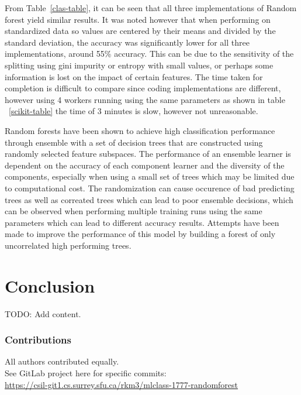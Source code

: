 \documentclass{article} %
\begin{document}
From Table~\ref{clas-table}, it can be seen that all three implementations of Random forest yield similar results. It was noted however that when performing on standardized data so values are centered by their means and divided by the standard deviation, the accuracy was significantly lower for all three implementations, around 55\% accuracy. This can be due to the sensitivity of the splitting using gini impurity or entropy with small values, or perhaps some information is lost on the impact of certain features. The time taken for completion is difficult to compare since coding implementations are different, however using 4 workers running using the same parameters as shown in table ~\ref{scikit-table} the time of 3 minutes is slow, however not unreasonable. 

Random forests have been shown to achieve high classification performance through ensemble with a set of decision trees that are constructed using randomly selected feature subspaces. The performance of an ensemble learner is dependent on the accuracy of each component learner and the diversity of the components, especially when using a small set of trees which may be limited due to computational cost. The randomization can cause occurence of bad predicting trees as well as correated trees which can lead to poor ensemble decisions, which can be observed when performing multiple training runs using the same parameters which can lead to different accuracy results. Attempts have been made to improve the performance of this model by building a forest of only uncorrelated high performing trees. \cite{Bharathidason2014}

\section{Conclusion}
TODO: Add content.


\subsubsection*{Contributions}
All authors contributed equally.\\
See GitLab project here for specific commits:\\
\href{
    https://csil-git1.cs.surrey.sfu.ca/rkm3/mlclass-1777-randomforest
}{
    https://csil-git1.cs.surrey.sfu.ca/rkm3/mlclass-1777-randomforest
}


\small{


}
\end{document}
